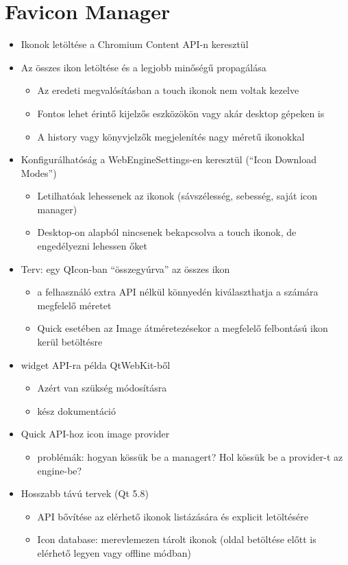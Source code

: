 \documentclass[12pt]{report}
\begin{document}
\section{Favicon Manager}
\begin{itemize}
    \item Ikonok letöltése a Chromium Content API-n keresztül
    \item Az összes ikon letöltése és a legjobb minőségű propagálása
        \begin{itemize}
            \item Az eredeti megvalósításban a touch ikonok nem voltak kezelve
            \item Fontos lehet érintő kijelzős eszközökön vagy akár desktop gépeken is
            \item A history vagy könyvjelzők megjelenítés nagy méretű ikonokkal
        \end{itemize}
    \item Konfigurálhatóság a WebEngineSettings-en keresztül (``Icon Download Modes'')
        \begin{itemize}
            \item Letilhatóak lehessenek az ikonok (sávszélesség, sebesség, saját icon
                manager)
            \item Desktop-on alapból nincsenek bekapcsolva a touch ikonok, de engedélyezni
                lehessen őket
        \end{itemize}
    \item Terv: egy QIcon-ban ``összegyúrva'' az összes ikon
        \begin{itemize}
            \item a felhasználó extra API nélkül könnyedén kiválaszthatja a számára
                megfelelő méretet
            \item Quick esetében az Image átméretezésekor a megfelelő felbontású ikon
                kerül betöltésre
        \end{itemize}
    \item widget API-ra példa QtWebKit-ből
        \begin{itemize}
            \item Azért van szükség módosításra
            \item kész dokumentáció
        \end{itemize}
    \item Quick API-hoz icon image provider
        \begin{itemize}
            \item problémák: hogyan kössük be a managert? Hol kössük be a provider-t az
                engine-be?
        \end{itemize}
    \item Hosszabb távú tervek (Qt 5.8)
        \begin{itemize}
            \item API bővítése az elérhető ikonok listázására és explicit letöltésére
            \item Icon database: merevlemezen tárolt ikonok (oldal betöltése előtt is
                elérhető legyen vagy offline módban)
        \end{itemize}
\end{itemize}
\end{document}
